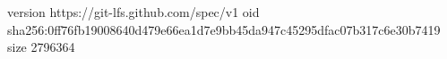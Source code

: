 version https://git-lfs.github.com/spec/v1
oid sha256:0ff76fb19008640d479e66ea1d7e9bb45da947c45295dfac07b317c6e30b7419
size 2796364
